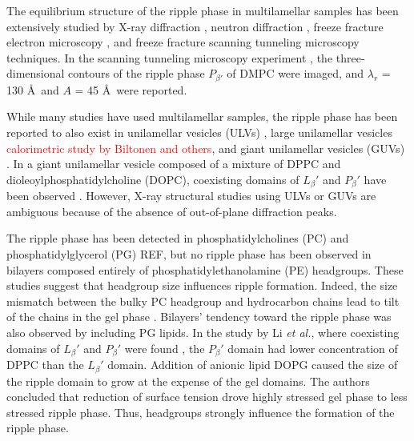 The equilibrium structure of the ripple phase in multilamellar samples has been 
extensively studied by
X-ray diffraction \cite{ref:Janiak76,ref:Janiak79,ref:Tardieu73,ref:Wack89,ref:Yao91,ref:Sun96,ref:Cunningham98},
neutron diffraction \cite{ref:Mortensen88,ref:Bradshaw89}, 
freeze fracture electron microscopy \cite{ref:Woodward96,ref:Copeland80,ref:Ruppel83},
and freeze fracture scanning tunneling microscopy \cite{ref:Zasadzinski88} techniques.
In the scanning tunneling microscopy experiment \cite{ref:Zasadzinski88}, 
the three-dimensional contours of the ripple phase $P_{\beta'}$ of
DMPC were imaged, and $\lambda_r$ = 130 \AA\ and $A$ = 45 \AA\ were reported.

While many studies have used multilamellar samples, the ripple phase has been reported
to also exist in unilamellar vesicles (ULVs) \cite{ref:Mason99,ref:Parente84},
large unilamellar vesicles \textcolor{red}{calorimetric study by Biltonen and others},
and giant unilamellar vesicles (GUVs) \cite{ref:Li06}. 
In a giant unilamellar vesicle composed of a mixture of DPPC and 
dioleoylphosphatidylcholine (\gls{DOPC}), 
coexisting domains of $L_\beta'$ and $P_\beta'$ have been observed \cite{ref:Li06}.
However, X-ray structural studies using ULVs or GUVs are ambiguous
because of the absence of out-of-plane diffraction peaks. 

The ripple phase has been detected in
phosphatidylcholines (\gls{PC}) and phosphatidylglycerol (\gls{PG}) {\jn REF},
but no ripple phase has been observed in bilayers composed entirely of 
phosphatidylethanolamine (\gls{PE}) headgroups.
These studies suggest that headgroup size influences
ripple formation. Indeed, the size mismatch
between the bulky PC headgroup and hydrocarbon chains lead to tilt of 
the chains in the gel phase \cite{ref:Nagle76,ref:Mcintosh80,Nagle00}. 
Bilayers' tendency toward the ripple phase was also observed by including PG lipids.
In the study by Li \textit{et al.}, where  
coexisting domains of $L_\beta'$ and $P_\beta'$ were found \cite{ref:Li06},
the $P_\beta'$ domain had lower concentration of DPPC than the $L_\beta'$
domain. Addition of anionic lipid DOPG caused the size of the ripple domain
to grow at the expense of the gel domains. The authors concluded that reduction of 
surface tension drove highly stressed gel phase to less stressed ripple phase.
Thus, headgroups strongly influence the formation of the ripple phase.

